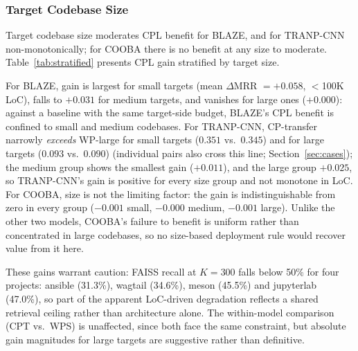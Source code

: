 \documentclass[a4paper,fleqn]{cas-dc}
\begin{document}
\subsubsection{Target Codebase Size}

 Target codebase size moderates CPL benefit for BLAZE, and for
TRANP-CNN non-monotonically; for COOBA there is no benefit at any size to
moderate. Table~\ref{tab:stratified} presents CPL gain stratified by
target size.

 For BLAZE, gain is largest for small targets (mean $\Delta$MRR $=
+0.058$, $<$100K LoC), falls to $+0.031$ for medium targets, and vanishes for
large ones ($+0.000$): against a baseline with the same target-side
budget, BLAZE's CPL benefit is confined to small and medium codebases. For
TRANP-CNN, CP-transfer narrowly \emph{exceeds} WP-large for
small targets ($0.351$ vs.\ $0.345$) and for large targets ($0.093$ vs.\
$0.090$) (individual
pairs also cross this line; Section~\ref{sec:cases}); the medium group
shows the smallest gain ($+0.011$), and the large group
$+0.025$, so TRANP-CNN's gain is positive for every size group and not monotone in
LoC. For COOBA, size is not the limiting factor: the gain is
indistinguishable from zero in every group ($-0.001$ small, $-0.000$ medium,
$-0.001$ large). Unlike the other two models, COOBA's failure to benefit is
uniform rather than concentrated in large codebases, so no size-based
deployment rule would recover value from it here.

These gains warrant caution: FAISS recall at $K=300$ falls below 50\% for
four projects: ansible (31.3\%), wagtail (34.6\%), meson (45.5\%) and
jupyterlab (47.0\%), so part of the apparent LoC-driven degradation reflects a shared
retrieval ceiling rather than architecture alone. The within-model
comparison (CPT vs.\ WPS) is unaffected, since both face the same
constraint, but absolute gain magnitudes for large targets are suggestive
rather than definitive.
\end{document}
